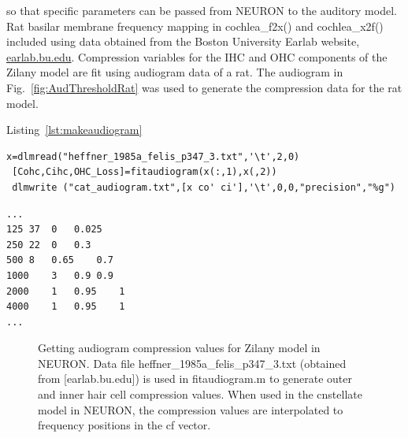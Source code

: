  so that
specific parameters can be passed from NEURON to the auditory model.  Rat
basilar membrane frequency mapping in \mbox{\textsf{cochlea\_f2x()}} and
\mbox{\textsf{cochlea\_x2f()}} included using data obtained from the Boston
University Earlab website, \url{earlab.bu.edu}.  Compression variables for the
IHC and OHC components of the Zilany model are fit using audiogram data of a
rat.  The audiogram in Fig.~\ref{fig:AudThresholdRat} was used to generate the
compression data for the rat model.

\medskip{}

Listing~\ref{lst:makeaudiogram}
\begin{lstlisting}[label=lst:makeaudiogram,caption=Using  \mbox{\textsf{fitaudiogram.m}} to create COHC and CIHC vectors for the cat.]
 x=dlmread("heffner_1985a_felis_p347_3.txt",'\t',2,0)
 [Cohc,Cihc,OHC_Loss]=fitaudiogram(x(:,1),x(,2))
 dlmwrite ("cat_audiogram.txt",[x co' ci'],'\t',0,0,"precision","%g")
\end{lstlisting}


\begin{lstlisting}[label=lst:cataudiogram,caption=Portion of \mbox{\textsf{cat\_audiogram\.txt}}]
...
125	37	0	0.025
250	22	0	0.3
500	8	0.65	0.7
1000	3	0.9	0.9
2000	1	0.95	1
4000	1	0.95	1
...
\end{lstlisting}

\begin{figure}[htb]
\begin{center}
\caption{Getting audiogram compression values for Zilany model in NEURON. Data file \mbox{heffner\_1985a\_felis\_p347\_3.txt} (obtained from [earlab.bu.edu]) is used in \textsf{fitaudiogram.m} to generate outer and inner hair cell compression values. When used in the \textsf{cnstellate} model in NEURON, the compression values are interpolated to frequency positions in the \textsf{cf} vector.}\label{fig:GetAudiogram}
\end{center}
\end{figure}

